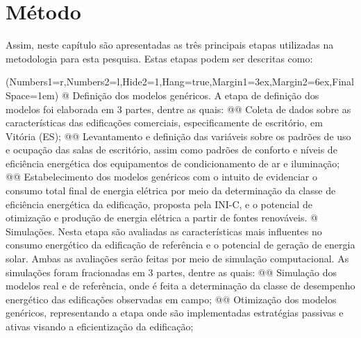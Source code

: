 \section{Método}
Assim, neste capítulo são apresentadas as três principais etapas utilizadas na 
metodologia para esta pesquisa. Estas etapas podem ser descritas como:
\begin{easylist}
    \ListProperties(Numbers1=r,Numbers2=l,Hide2=1,Hang=true,Margin1=3ex,Margin2=6ex,FinalSpace=1em)
    @ Definição dos modelos genéricos. A etapa de definição dos modelos foi elaborada em 3 partes, 
    dentre as quais:
        @@ Coleta    de    dados    sobre    as    características    das    edificações    comerciais, 
        especificamente de escritório, em Vitória (ES);
        @@ Levantamento e definição das variáveis sobre os padrões de uso e ocupação das 
        salas  de  escritório,  assim  como  padrões  de  conforto  e  níveis  de  
        eficiência energética dos equipamentos de condicionamento de ar e iluminação;
        @@ Estabelecimento  dos  modelos  genéricos com  o  intuito de  evidenciar o  
        consumo total  final  de  energia  elétrica  por  meio  da  determinação  da  classe  
        de  eficiência energética  da  edificação,  proposta  pela  INI-C,  e  o  
        potencial  de  otimização  e produção de energia elétrica a partir de fontes renováveis.
    @ Simulações.  Nesta  etapa  são  avaliadas  as  características  mais  influentes  
    no  consumo energético da edificação de referência e o potencial de geração de energia 
    solar. Ambas as  avaliações  serão  feitas  por  meio  de  simulação  computacional.  
    As  simulações  foram fracionadas em 3 partes, dentre as quais:
        @@ Simulação dos modelos real e de referência, onde é feita a determinação da classe 
        de desempenho energético das edificações observadas em campo; 
        @@ Otimização    dos    modelos    genéricos,    representando    a    etapa    onde    
        são implementadas estratégias passivas e ativas visando a eficientização da edificação;

\end{easylist}